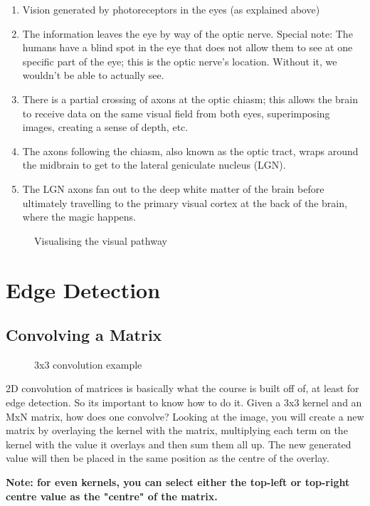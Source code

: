 \begin{enumerate}
	\item Vision generated by photoreceptors in the eyes (as explained above)
	\item The information leaves the eye by way of the optic nerve. Special note: The humans have a blind spot in the eye that does not allow them to see at one specific part of the eye; this is the optic nerve's location. Without it, we wouldn't be able to actually see.
	\item There is a partial crossing of axons at the optic chiasm; this allows the brain to receive data on the same visual field from both eyes, superimposing images, creating a sense of depth, etc.
	\item The axons following the chiasm, also known as the optic tract, wraps around the midbrain to get to the lateral geniculate nucleus (LGN).
	\item The LGN axons fan out to the deep white matter of the brain before ultimately travelling to the primary visual cortex at the back of the brain, where the magic happens.
\end{enumerate}
\begin{figure}[!htb]
	\caption{\label{fig:visPathway} Visualising the visual pathway}
\end{figure}

\section{Edge Detection}
\subsection{Convolving a Matrix}
\begin{figure}[!htb]
	\caption{\label{fig:convolve} 3x3 convolution example}
\end{figure}
2D convolution of matrices is basically what the course is built off of, at least for edge detection. So its important to know how to do it. Given a 3x3 kernel and an MxN matrix, how does one convolve? Looking at the image, you will create a new matrix by overlaying the kernel with the matrix, multiplying each term on the kernel with the value it overlays and then sum them all up. The new generated value will then be placed in the same position as the centre of the overlay. 

\textbf{Note: for even kernels, you can select either the top-left or top-right centre value as the "centre" of the matrix.}


